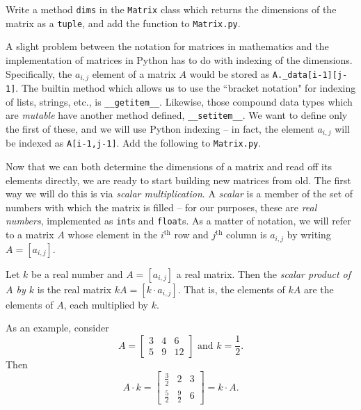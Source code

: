 \documentclass[m3380-lec-main.tex]{subfiles}
\begin{document}
\begin{exc} Write a method \verb|dims| in the \verb|Matrix| class which returns the dimensions of the matrix as a \verb|tuple|, and add the function to \verb|Matrix.py|.
\end{exc}

A slight problem between the notation for matrices in mathematics and the implementation of matrices in Python has to do with indexing of the dimensions. Specifically, the $a_{i,j}$ element of a matrix $A$ would be stored as \verb|A._data[i-1][j-1]|. The builtin method which allows us to use the ``bracket notation" for indexing of lists, strings, etc., is \verb|__getitem__|. Likewise, those compound data types which are \emph{mutable} have another method defined, \verb|__setitem__|. We want to define only the first of these, and we will use Python indexing -- in fact, the element $a_{i,j}$ will be indexed as \verb|A[i-1,j-1]|. Add the following to \verb|Matrix.py|.

\smallskip\noindent

Now that we can both determine the dimensions of a matrix and read off its elements directly, we are ready to start building new matrices from old. The first way we will do this is via \emph{scalar multiplication}. A \emph{scalar} is a member of the set of numbers with which the matrix is filled -- for our purposes, these are \emph{real numbers}, implemented as \verb|int|s and \verb|float|s. As a matter of notation, we will refer to a matrix $A$ whose element in the $i^\text{th}$ row and $j^\text{th}$ column is $a_{i,j}$ by writing $A=[a_{i,j}]$.

\begin{defn} Let $k$ be a real number and $A=[a_{i,j}]$ a real matrix. Then the \emph{scalar product of $A$ by $k$} is the real matrix $kA = [k\cdot a_{i,j}]$. That is, the elements of $kA$ are the elements of $A$, each multiplied by $k$.
\end{defn}

\begin{exmp} As an example, consider
\[
A = \begin{bmatrix} 3 & 4 & 6 \\ 5 & 9 & 12 \end{bmatrix}\text{ and } k =\frac12. \] Then 
\[A\cdot k = \begin{bmatrix} \frac32 & 2 & 3 \\ \frac52 & \frac92 & 6\end{bmatrix}= k\cdot A .\]


\end{exmp}
\end{document}
